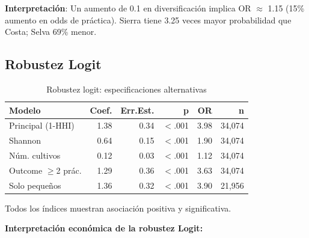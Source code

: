 \documentclass[11pt,a4paper]{article}
\begin{document}
\textbf{Interpretación}: Un aumento de 0.1 en diversificación implica OR $\approx$ 1.15 (15\% aumento en odds de práctica). Sierra tiene 3.25 veces mayor probabilidad que Costa; Selva 69\% menor.

\subsection{Robustez Logit}

\begin{table}[H]
\centering
\caption{Robustez logit: especificaciones alternativas}
\label{tab:logit_robustness}
\begin{threeparttable}
\small
\begin{tabular}{lrrrrr}
\toprule
\textbf{Modelo} & \textbf{Coef.} & \textbf{Err.Est.} & \textbf{p} & \textbf{OR} & \textbf{n} \\
\midrule
Principal (1-HHI) & 1.38 & 0.34 & $<$.001 & 3.98 & 34,074 \\
Shannon & 0.64 & 0.15 & $<$.001 & 1.90 & 34,074 \\
Núm. cultivos & 0.12 & 0.03 & $<$.001 & 1.12 & 34,074 \\
Outcome $\geq$2 prác. & 1.29 & 0.36 & $<$.001 & 3.63 & 34,074 \\
Solo pequeños & 1.36 & 0.32 & $<$.001 & 3.90 & 21,956 \\
\bottomrule
\end{tabular}
\begin{tablenotes}
\footnotesize
\item Todos los índices muestran asociación positiva y significativa.
\end{tablenotes}
\end{threeparttable}
\end{table}

\textbf{Interpretación económica de la robustez Logit:}
\end{document}
